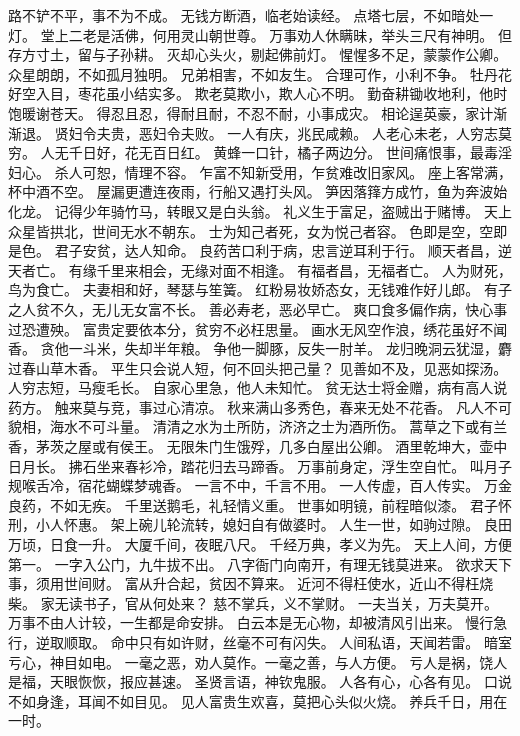 \documentclass[12pt,UTF8]{ctexbook}
\begin{document}
路不铲不平，事不为不成。
无钱方断酒，临老始读经。
点塔七层，不如暗处一灯。
堂上二老是活佛，何用灵山朝世尊。
万事劝人休瞒昧，举头三尺有神明。
但存方寸土，留与子孙耕。
灭却心头火，剔起佛前灯。
惺惺多不足，蒙蒙作公卿。
众星朗朗，不如孤月独明。
兄弟相害，不如友生。
合理可作，小利不争。
牡丹花好空入目，枣花虽小结实多。
欺老莫欺小，欺人心不明。
勤奋耕锄收地利，他时饱暖谢苍天。
得忍且忍，得耐且耐，不忍不耐，小事成灾。
相论逞英豪，家计渐渐退。
贤妇令夫贵，恶妇令夫败。
一人有庆，兆民咸赖。
人老心未老，人穷志莫穷。
人无千日好，花无百日红。
黄蜂一口针，橘子两边分。
世间痛恨事，最毒淫妇心。
杀人可恕，情理不容。
乍富不知新受用，乍贫难改旧家风。
座上客常满，杯中酒不空。
屋漏更遭连夜雨，行船又遇打头风。
笋因落箨方成竹，鱼为奔波始化龙。
记得少年骑竹马，转眼又是白头翁。
礼义生于富足，盗贼出于赌博。
天上众星皆拱北，世间无水不朝东。
士为知己者死，女为悦己者容。
色即是空，空即是色。
君子安贫，达人知命。
良药苦口利于病，忠言逆耳利于行。
顺天者昌，逆天者亡。
有缘千里来相会，无缘对面不相逢。
有福者昌，无福者亡。
人为财死，鸟为食亡。
夫妻相和好，琴瑟与笙簧。
红粉易妆娇态女，无钱难作好儿郎。
有子之人贫不久，无儿无女富不长。
善必寿老，恶必早亡。
爽口食多偏作病，快心事过恐遭殃。
富贵定要依本分，贫穷不必枉思量。
画水无风空作浪，绣花虽好不闻香。
贪他一斗米，失却半年粮。
争他一脚豚，反失一肘羊。
龙归晚洞云犹湿，麝过春山草木香。
平生只会说人短，何不回头把己量？
见善如不及，见恶如探汤。
人穷志短，马瘦毛长。
自家心里急，他人未知忙。
贫无达士将金赠，病有高人说药方。
触来莫与竞，事过心清凉。
秋来满山多秀色，春来无处不花香。
凡人不可貌相，海水不可斗量。
清清之水为土所防，济济之士为酒所伤。
蒿草之下或有兰香，茅茨之屋或有侯王。
无限朱门生饿殍，几多白屋出公卿。
酒里乾坤大，壶中日月长。
拂石坐来春衫冷，踏花归去马蹄香。
万事前身定，浮生空自忙。
叫月子规喉舌冷，宿花蝴蝶梦魂香。
一言不中，千言不用。
一人传虚，百人传实。
万金良药，不如无疾。
千里送鹅毛，礼轻情义重。
世事如明镜，前程暗似漆。
君子怀刑，小人怀惠。
架上碗儿轮流转，媳妇自有做婆时。
人生一世，如驹过隙。
良田万顷，日食一升。
大厦千间，夜眠八尺。
千经万典，孝义为先。
天上人间，方便第一。
一字入公门，九牛拔不出。
八字衙门向南开，有理无钱莫进来。
欲求天下事，须用世间财。
富从升合起，贫因不算来。
近河不得枉使水，近山不得枉烧柴。
家无读书子，官从何处来？
慈不掌兵，义不掌财。
一夫当关，万夫莫开。
万事不由人计较，一生都是命安排。
白云本是无心物，却被清风引出来。
慢行急行，逆取顺取。
命中只有如许财，丝毫不可有闪失。
人间私语，天闻若雷。
暗室亏心，神目如电。
一毫之恶，劝人莫作。一毫之善，与人方便。
亏人是祸，饶人是福，天眼恢恢，报应甚速。
圣贤言语，神钦鬼服。
人各有心，心各有见。
口说不如身逢，耳闻不如目见。
见人富贵生欢喜，莫把心头似火烧。
养兵千日，用在一时。
\end{document}
